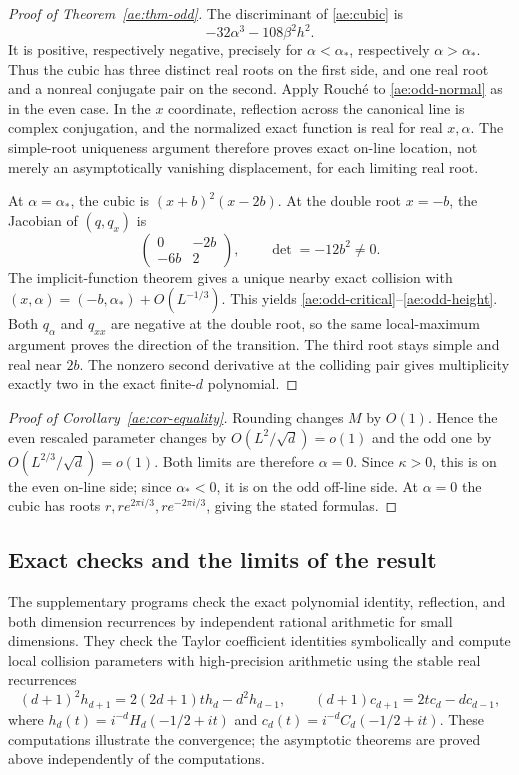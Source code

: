\begin{proof}[Proof of Theorem~\ref{ae:thm-odd}]
The discriminant of \eqref{ae:cubic} is
\[
 -32\alpha^3-108\beta^2h^2.
\]
It is positive, respectively negative, precisely for
$\alpha<\alpha_*$, respectively $\alpha>\alpha_*$. Thus the cubic
has three distinct real roots on the first side, and one real root and
a nonreal conjugate pair on the second. Apply Rouch\'e to
\eqref{ae:odd-normal} as in the even case. In the $x$ coordinate,
reflection across the canonical line is complex conjugation, and the
normalized exact function is real for real $x,\alpha$. The simple-root
uniqueness argument therefore proves exact on-line location, not merely
an asymptotically vanishing displacement, for each limiting real root.

At $\alpha=\alpha_*$, the cubic is $(x+b)^2(x-2b)$. At the double
root $x=-b$, the Jacobian of $(q,q_x)$ is
\[
 \begin{pmatrix}0&-2b\\-6b&2\end{pmatrix},\qquad
 \det=-12b^2\ne0.
\]
The implicit-function theorem gives a unique nearby exact collision
with $(x,\alpha)=(-b,\alpha_*)+O(L^{-1/3})$. This yields
\eqref{ae:odd-critical}--\eqref{ae:odd-height}. Both $q_\alpha$ and
$q_{xx}$ are negative at the double root, so the same local-maximum
argument proves the direction of the transition. The third root stays
simple and real near $2b$. The nonzero second derivative at the colliding
pair gives multiplicity exactly two in the exact finite-$d$ polynomial.
\end{proof}

\begin{proof}[Proof of Corollary~\ref{ae:cor-equality}]
Rounding changes $M$ by $O(1)$. Hence the even rescaled parameter changes
by $O(L^2/\sqrt d)=o(1)$ and the odd one by
$O(L^{2/3}/\sqrt d)=o(1)$. Both limits are therefore $\alpha=0$.
Since $\kappa>0$, this is on the even on-line side; since
$\alpha_*<0$, it is on the odd off-line side. At $\alpha=0$ the cubic
has roots $r,r e^{2\pi i/3},r e^{-2\pi i/3}$, giving the stated formulas.
\end{proof}

\subsection{Exact checks and the limits of the result}
The supplementary programs check the exact polynomial identity, reflection,
and both dimension recurrences by independent rational arithmetic for
small dimensions. They check the Taylor coefficient identities symbolically
and compute local collision parameters with high-precision arithmetic
using the stable real recurrences
\[
 (d+1)^2h_{d+1}=2(2d+1)t h_d-d^2h_{d-1},\qquad
 (d+1)c_{d+1}=2t c_d-dc_{d-1},
\]
where $h_d(t)=i^{-d}H_d(-1/2+it)$ and
$c_d(t)=i^{-d}C_d(-1/2+it)$. These computations illustrate the
convergence; the asymptotic theorems are proved above independently of
the computations.

